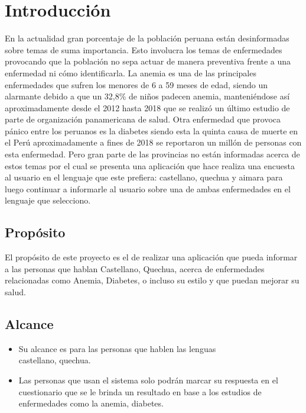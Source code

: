 \chapter{Introducción}
En la actualidad gran porcentaje de la población peruana están desinformadas sobre temas de suma importancia. Esto involucra los temas de enfermedades provocando que la población no sepa actuar de manera preventiva frente a una enfermedad ni cómo identificarla. La anemia es una de las principales enfermedades que sufren los menores de 6 a 59 meses de edad, siendo un alarmante debido a que un 32,8\% de niños padecen anemia, manteniéndose así aproximadamente desde el 2012 hasta 2018 que se realizó un último estudio de parte de organización panamericana de salud. Otra enfermedad que provoca pánico entre los peruanos es la diabetes siendo esta la quinta causa de muerte en el Perú aproximadamente a fines de 2018 se reportaron un millón de personas con esta enfermedad. Pero gran parte de las provincias no están informadas acerca de estos temas por el cual se presenta una aplicación que hace realiza una encuesta al usuario en el lenguaje que este prefiera: castellano, quechua y aimara para luego continuar a informarle al usuario sobre una de ambas enfermedades en el lenguaje que selecciono. 
\section{Propósito}
El propósito de este proyecto es el de realizar una aplicación que pueda informar a las personas que hablan Castellano, Quechua, acerca de enfermedades relacionadas como Anemia, Diabetes, o incluso su estilo y que puedan mejorar su salud.  
\section{Alcance}
\begin{itemize}
\item Su alcance es para las personas que hablen las lenguas \\castellano, quechua.
\item Las personas que usan el sistema solo podrán marcar su respuesta en el cuestionario que se le brinda un resultado en base a los estudios de enfermedades como la anemia, diabetes.
\end{itemize}

